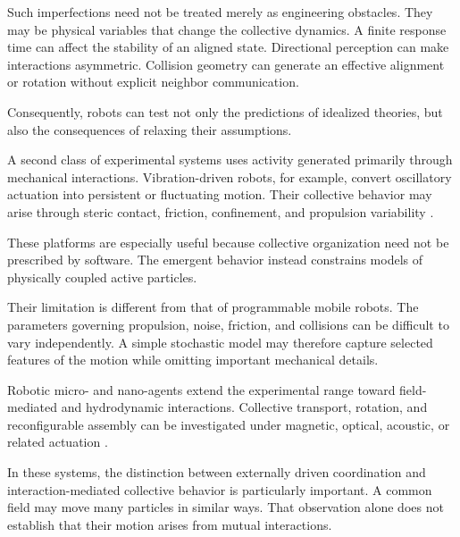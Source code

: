 Such imperfections need not be
treated merely as engineering
obstacles. They may be physical
variables that change the
collective dynamics. A finite
response time can affect
the stability of an
aligned state. Directional
perception can make
interactions asymmetric.
Collision geometry can
generate an effective
alignment or rotation
without explicit
neighbor communication.

Consequently, robots
can test not only
the predictions of
idealized theories,
but also the
consequences of
relaxing their
assumptions.

A second class of
experimental systems
uses activity generated
primarily through
mechanical interactions.
Vibration-driven robots,
for example, convert
oscillatory actuation
into persistent or
fluctuating motion.
Their collective behavior
may arise through
steric contact,
friction, confinement,
and propulsion variability
\cite{Welch2018aggregatesuppressio,Welch2019activereorientation,Deblais2019howtoforceanarmy,Scholz2018rotatingrobotsmove,Chvykov2020lowrattlingapred,Xi2024emergentintelligenc,Boudet2025nonmarkoviandynami}.

These platforms are
especially useful
because collective
organization need
not be prescribed
by software.
The emergent behavior
instead constrains
models of physically
coupled active particles.

Their limitation
is different from
that of programmable
mobile robots.
The parameters
governing propulsion,
noise, friction,
and collisions
can be difficult
to vary independently.
A simple stochastic
model may therefore
capture selected
features of the
motion while omitting
important mechanical
details.

Robotic micro- and
nano-agents extend
the experimental
range toward
field-mediated
and hydrodynamic
interactions.
Collective transport,
rotation, and
reconfigurable assembly
can be investigated
under magnetic,
optical, acoustic,
or related actuation
\cite{Yigit2019programmablecollect,Xie2020bioinspiredsoftmic,Sun2021swarmingmicrodrople,Pauer2021programmabledesign,Das2023optoelectronictraje,Rivas2023spatialpatterningo,McGovern2024multifunctionalchir,Sun2024multiplemagnetoopt,Cheng2025selfassemblyandco}.

In these systems,
the distinction
between externally
driven coordination
and interaction-mediated
collective behavior
is particularly important.
A common field
may move many
particles in
similar ways.
That observation
alone does not
establish that
their motion
arises from
mutual interactions.

